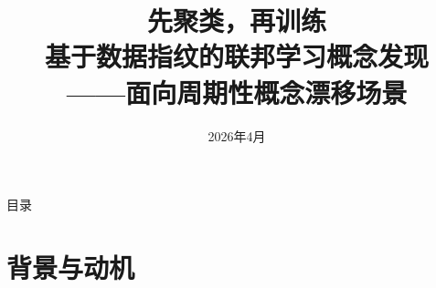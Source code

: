 \documentclass[aspectratio=169,11pt]{ctexbeamer}
\title[FedProTrack]{先聚类，再训练\\[4pt]
  \normalsize 基于数据指纹的联邦学习概念发现\\
  ——面向周期性概念漂移场景}
\author{}
\date{2026年4月}
\institute{}
\begin{document}
\begin{frame}[plain]
\titlepage
\end{frame}

\begin{frame}{目录}
\tableofcontents
\end{frame}

\section{背景与动机}

\end{document}
